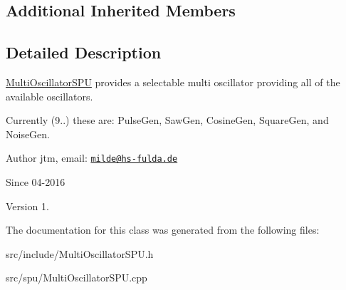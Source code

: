\subsection*{Additional Inherited Members}


\subsection{Detailed Description}
\hyperlink{classMultiOscillatorSPU}{Multi\-Oscillator\-S\-P\-U} provides a selectable multi oscillator providing all of the available oscillators.

Currently (9..) these are\-: Pulse\-Gen, Saw\-Gen, Cosine\-Gen, Square\-Gen, and Noise\-Gen.

\begin{DoxyAuthor}{Author}
jtm, email\-:  \href{mailto:milde@hs-fulda.de}{\tt milde@hs-\/fulda.\-de} 
\end{DoxyAuthor}
\begin{DoxySince}{Since}
04-\/2016 
\end{DoxySince}
\begin{DoxyVersion}{Version}
1. 
\end{DoxyVersion}


The documentation for this class was generated from the following files\-:\begin{DoxyCompactItemize}
\item 
src/include/Multi\-Oscillator\-S\-P\-U.\-h\item 
src/spu/Multi\-Oscillator\-S\-P\-U.\-cpp\end{DoxyCompactItemize}
